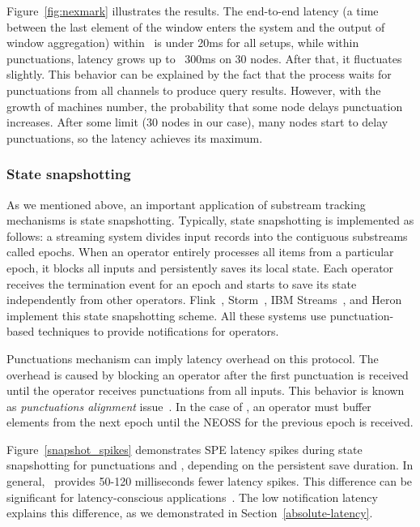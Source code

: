 
Figure~\ref{fig:nexmark} illustrates the results. The end-to-end latency (a time between the last element of the window enters the system and the output of window aggregation) within \tracker\ is under 20ms for all setups, while within punctuations, latency grows up to ~300ms on 30 nodes. After that, it fluctuates slightly. This behavior can be explained by the fact that the process waits for punctuations from all channels to produce query results. However, with the growth of machines number, the probability that some node delays punctuation increases. After some limit (30 nodes in our case), many nodes start to delay punctuations, so the latency achieves its maximum. 

\subsubsection{State snapshotting}
As we mentioned above, an important application of substream tracking mechanisms is state snapshotting. Typically, state snapshotting is implemented as follows: a streaming system divides input records into the contiguous substreams called epochs. When an operator entirely processes all items from a particular epoch, it blocks all inputs and persistently saves its local state. Each operator receives the termination event for an epoch and starts to save its state independently from other operators. Flink~\cite{Carbone:2017:SMA:3137765.3137777}, Storm~\cite{apache:storm:state}, IBM Streams~\cite{jacques2016consistent}, and Heron~\cite{Kulkarni:2015:THS:2723372.2742788} implement this state snapshotting scheme. All these systems use punctuation-based techniques to provide notifications for operators.

Punctuations mechanism can imply latency overhead on this protocol. The overhead is caused by blocking an operator after the first punctuation is received until the operator receives punctuations from all inputs. This behavior is known as {\em punctuations alignment} issue~\cite{Carbone:2017:SMA:3137765.3137777}. In the case of \tracker , an operator must buffer elements from the next epoch until the NEOSS for the previous epoch is received.

Figure~\ref{snapshot_spikes} demonstrates SPE latency spikes during state snapshotting for punctuations and \tracker, depending on the persistent save duration. In general, \tracker\ provides 50-120 milliseconds fewer latency spikes. This difference can be significant for latency-conscious applications~\cite{zhang2017sub}. The low notification latency explains this difference, as we demonstrated in Section~\ref{absolute-latency}. 

